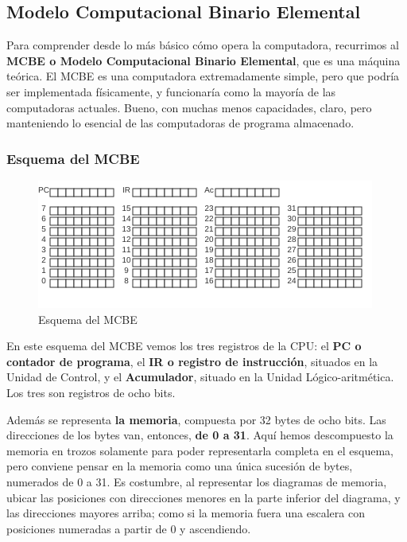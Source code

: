 \documentclass[spanish,A4,]{article}
\begin{document}
\subsection{Modelo Computacional Binario
Elemental}\label{modelo-computacional-binario-elemental}

Para comprender desde lo más básico cómo opera la computadora,
recurrimos al \textbf{MCBE o Modelo Computacional Binario Elemental},
que es una máquina teórica. El MCBE es una computadora extremadamente
simple, pero que podría ser implementada físicamente, y funcionaría como
la mayoría de las computadoras actuales. Bueno, con muchas menos
capacidades, claro, pero manteniendo lo esencial de las computadoras de
programa almacenado.

\subsubsection{Esquema del MCBE}\label{esquema-del-mcbe}

\begin{figure}[htbp]
\centering
\includegraphics{img/MCBE.png}
\caption{Esquema del MCBE}
\end{figure}

En este esquema del MCBE vemos los tres registros de la CPU: el
\textbf{PC o contador de programa}, el \textbf{IR o registro de
instrucción}, situados en la Unidad de Control, y el
\textbf{Acumulador}, situado en la Unidad Lógico-aritmética. Los tres
son registros de ocho bits.

Además se representa \textbf{la memoria}, compuesta por 32 bytes de ocho
bits. Las direcciones de los bytes van, entonces, \textbf{de 0 a 31}.
Aquí hemos descompuesto la memoria en trozos solamente para poder
representarla completa en el esquema, pero conviene pensar en la memoria
como una única sucesión de bytes, numerados de 0 a 31. Es costumbre, al
representar los diagramas de memoria, ubicar las posiciones con
direcciones menores en la parte inferior del diagrama, y las direcciones
mayores arriba; como si la memoria fuera una escalera con posiciones
numeradas a partir de 0 y ascendiendo.
\end{document}

